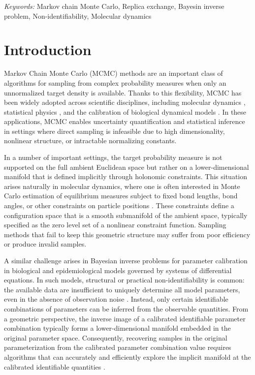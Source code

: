 \documentclass[12pt]{article}
\begin{document}
\noindent%
{\it Keywords:}  
Markov chain Monte Carlo, 
Replica exchange,
Bayesin inverse problem,
Non-identifiability,
Molecular dynamics

\section{Introduction}\label{sec1}
Markov Chain Monte Carlo (MCMC) methods are an important class of algorithms for sampling from complex probability measures when only an unnormalized target density is available. Thanks to this flexibility, MCMC has been widely adopted across scientific disciplines, including molecular dynamics \citep{J1}, statistical physics \citep{J2}, and the calibration of biological dynamical models \citep{J3}. In these applications, MCMC enables uncertainty quantification and statistical inference in settings where direct sampling is infeasible due to high dimensionality, nonlinear structure, or intractable normalizing constants.

In a number of important settings, the target probability measure is not supported on the full ambient Euclidean space but rather on a lower-dimensional manifold that is defined implicitly through holonomic constraints. This situation arises naturally in molecular dynamics, where one is often interested in Monte Carlo estimation of equilibrium measures subject to fixed bond lengths, bond angles, or other constraints on particle positions \citep{J4,J5}. These constraints define a configuration space that is a smooth submanifold of the ambient space, typically specified as the zero level set of a nonlinear constraint function. Sampling methods that fail to keep this geometric structure may suffer from poor efficiency or produce invalid samples.

A similar challenge arises in Bayesian inverse problems for parameter calibration in biological and epidemiological models governed by systems of differential equations. In such models, structural or practical non-identifiability is common: the available data are insufficient to uniquely determine all model parameters, even in the absence of observation noise \citep{J6}. Instead, only certain identifiable combinations of parameters can be inferred from the observable quantities.
From a geometric perspective, the inverse image of a calibrated identifiable parameter combination typically forms a lower-dimensional manifold embedded in the original parameter space. Consequently, recovering samples in the original parameterization from the calibrated parameter combination value requires algorithms that can accurately and efficiently explore the implicit manifold at the calibrated identifiable quantities \citep{Mlift,J7,J8}.
\end{document}
